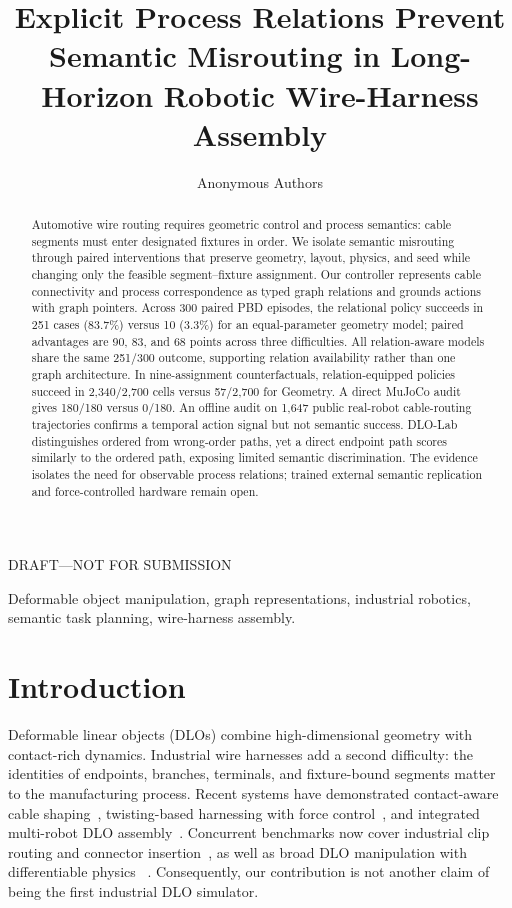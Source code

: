 \documentclass[journal]{IEEEtran}
\title{Explicit Process Relations Prevent Semantic Misrouting in Long-Horizon
Robotic Wire-Harness Assembly}
\author{Anonymous Authors}
\date{}
\newcommand{\draftwarning}{\textcolor{draftred}{DRAFT---NOT FOR SUBMISSION}}
\begin{document}
\maketitle

\begin{center}
\draftwarning
\end{center}

\begin{abstract}
Automotive wire routing requires geometric control and process semantics:
cable segments must enter designated fixtures in order. We isolate semantic
misrouting through paired interventions that preserve geometry, layout, physics,
and seed while changing
only the feasible segment--fixture assignment. Our controller represents cable
connectivity and process correspondence as typed graph relations and grounds
actions with graph pointers. Across 300 paired PBD episodes, the relational
policy succeeds in 251 cases (83.7\%) versus 10 (3.3\%) for an equal-parameter
geometry model; paired advantages are 90, 83, and 68 points across three
difficulties. All relation-aware models share the same 251/300 outcome,
supporting relation availability rather than one graph architecture. In
nine-assignment counterfactuals, relation-equipped policies
succeed in 2,340/2,700 cells versus 57/2,700 for Geometry. A direct MuJoCo audit
gives 180/180 versus 0/180. An offline audit on 1,647 public real-robot
cable-routing trajectories confirms a temporal action signal but not semantic
success. DLO-Lab distinguishes ordered from wrong-order paths, yet a direct
endpoint path scores similarly to the ordered path, exposing limited semantic
discrimination. The evidence isolates the need for observable process
relations; trained external semantic replication and force-controlled hardware
remain open.
\end{abstract}

\begin{IEEEkeywords}
Deformable object manipulation, graph representations, industrial robotics,
semantic task planning, wire-harness assembly.
\end{IEEEkeywords}

\section{Introduction}

Deformable linear objects (DLOs) combine high-dimensional geometry with
contact-rich dynamics.  Industrial wire harnesses add a second difficulty:
the identities of endpoints, branches, terminals, and fixture-bound segments
matter to the manufacturing process.  Recent systems have demonstrated
contact-aware cable shaping~\cite{chen2023contact}, twisting-based harnessing
with force control~\cite{zhang2024twisting}, and integrated multi-robot DLO
assembly~\cite{chen2025multirobot}.  Concurrent benchmarks now cover
industrial clip routing and connector insertion~\cite{zhu2026wirecraft}, as
well as broad DLO manipulation with differentiable physics
~\cite{cao2026dlolab}.  Consequently, our contribution is not another claim of
being the first industrial DLO simulator.
\end{document}
